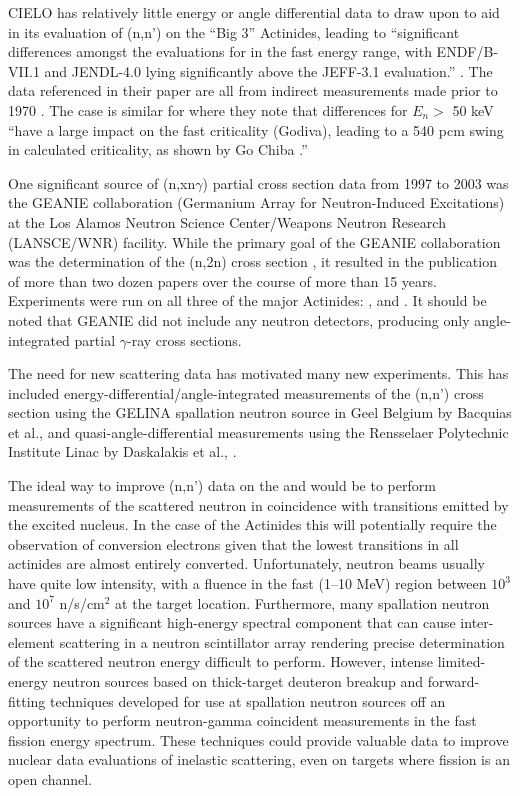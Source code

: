 \documentclass[letterpaper,draft]{ar-1col}
\begin{document}
CIELO has relatively little energy or angle differential data to draw upon to aid in its evaluation of (n,n') on the \enquote{Big 3} Actinides, leading to \enquote{significant differences amongst the evaluations for  in the fast energy range, with ENDF/B-VII.1 and JENDL-4.0 lying significantly above the JEFF-3.1 evaluation.} \cite{Cha14}.  The  data referenced in their paper are all from indirect measurements made prior to 1970 \cite{Bat69, And61}.  The case is similar for  where they note that differences for $E_n >$ 50 keV \enquote{have a large impact on the fast criticality (Godiva), leading to a 540 pcm swing in calculated criticality, as shown by Go Chiba \cite{Chi12}.}

One significant source of (n,xn$\gamma$) partial cross section data from 1997 to 2003 was the GEANIE collaboration (Germanium Array for Neutron-Induced Excitations) at the Los Alamos Neutron Science Center/Weapons Neutron Research (LANSCE/WNR) facility. While the primary goal of the GEANIE collaboration was the determination of the (n,2n) cross section \cite{Ber02}, it resulted in the publication of more than two dozen papers over the course of more than 15 years.  Experiments were run on all three of the major Actinides:  \cite{You01},  \cite{Ber02} and  \cite{Fot04}.  It should be noted that GEANIE did not include any neutron detectors, producing only angle-integrated partial $\gamma$-ray cross sections.  

The need for new scattering data has motivated many new experiments.  This has included energy-differential/angle-integrated measurements of the (n,n') cross section using the GELINA spallation neutron source in Geel Belgium by Bacquias et al., \cite{Nem13} and quasi-angle-differential measurements using the Rensselaer Polytechnic Institute Linac by Daskalakis et al., \cite{Das14}. 

The ideal way to improve (n,n') data on the  and  would be to perform measurements of the scattered neutron in coincidence with transitions emitted by the excited nucleus.  In the case of the Actinides this will potentially require the observation of conversion electrons given that the lowest transitions in all actinides are almost entirely converted.  Unfortunately, neutron beams usually have quite low intensity, with a fluence in the fast (1--10 MeV) region between $10^3$ and $10^7$ n/s/cm$^2$ at the target location.  Furthermore, many spallation neutron sources have a significant high-energy spectral component that can cause inter-element scattering in a neutron scintillator array rendering precise determination of the scattered neutron energy difficult to  perform. However, intense limited-energy neutron sources based on thick-target deuteron breakup \cite{Harrig2018} and forward-fitting techniques developed for use at spallation neutron sources \cite{Kee18} off an opportunity to perform neutron-gamma coincident measurements in the fast fission energy spectrum.  These techniques could provide valuable data to improve nuclear data evaluations of inelastic scattering, even on targets where fission is an open channel. 
\end{document}
